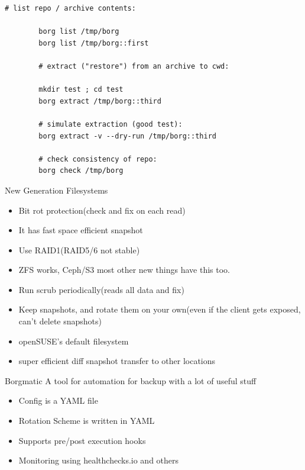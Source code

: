 \documentclass{beamer}
\begin{document}
\begin{frame}[fragile]
	\begin{lstlisting}[backgroundcolor = \color{black},
		basicstyle=\color{lightgray}
		language = bash,
		framexleftmargin = 1em]
		# list repo / archive contents:
		
		borg list /tmp/borg
		borg list /tmp/borg::first
		
		# extract ("restore") from an archive to cwd:
		
		mkdir test ; cd test
		borg extract /tmp/borg::third
		
		# simulate extraction (good test):
		borg extract -v --dry-run /tmp/borg::third
		
		# check consistency of repo:
		borg check /tmp/borg
	\end{lstlisting}
\end{frame}
\begin{frame}{New Generation Filesystems}
\begin{itemize}
	\item Bit rot protection(check and fix on each read)
	\item It has fast space efficient snapshot 
	\item Use RAID1(RAID5/6 not stable)
	\item ZFS works, Ceph/S3 most other new things have this too.
	\item Run scrub periodically(reads all data and fix)
	\item Keep snapshots, and rotate them on your own(even if the client gets exposed, can't delete snapshots)
	\item openSUSE's default filesystem
	\item super efficient diff snapshot transfer to other locations
\end{itemize}
\end{frame}


\begin{frame}{Borgmatic}
	A tool for automation for backup with a lot of useful stuff
	\begin{itemize}
		\item Config is a YAML file
		\item Rotation Scheme is written in YAML
		\item Supports pre/post execution hooks
		\item Monitoring using healthchecks.io and others
	\end{itemize}
\end{frame}
\end{document}
